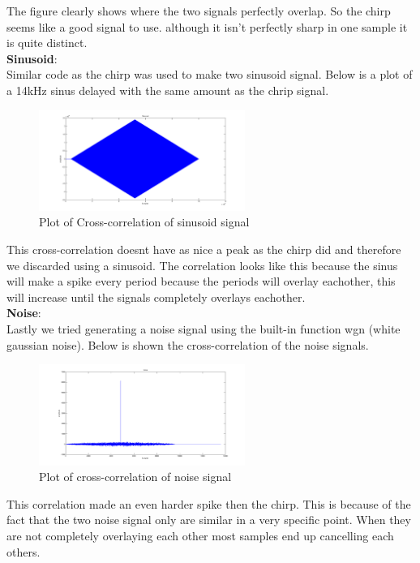 The figure clearly shows where the two signals perfectly overlap. So the chirp seems like a good signal to use. although it isn't perfectly sharp in one sample it is quite distinct.\\
\textbf{Sinusoid}:\\
Similar code as the chirp was used to make two sinusoid signal. Below is a plot of a 14kHz sinus delayed with the same amount as the chrip signal.\\
\begin{figure}[H]
\centering
\includegraphics[width=0.6\textwidth]{billeder/sinus_xcorr_fig}
\caption{Plot of Cross-correlation of sinusoid signal}
\label{fig:sinus_xcorr_plot}
\end{figure}
This cross-correlation doesnt have as nice a peak as the chirp did and therefore we discarded using a sinusoid. The correlation looks like this because the sinus will make a spike every period because the periods will overlay eachother, this will increase until the signals completely overlays eachother.\\
\textbf{Noise}:\\
Lastly we tried generating a noise signal using the built-in function wgn (white gaussian noise). Below is shown the cross-correlation of the noise signals.\\
\begin{figure}[H]
\centering
\includegraphics[width=0.6\textwidth]{billeder/noise_xcorr_fig}
\caption{Plot of cross-correlation of noise signal}
\label{fig:noise_xcorr_plot}
\end{figure}
This correlation made an even harder spike then the chirp. This is because of the fact that the  two noise signal only are similar in a very specific point. When they are not completely overlaying each other most samples end up cancelling each others.
